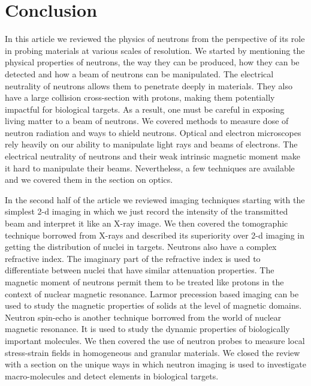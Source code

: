 \documentclass{article}
\numberwithin{equation}{section}
\begin{document}
\section{Conclusion}\label{s15}
In this article we reviewed the physics of neutrons from the perspective of its
role in probing materials at various scales of resolution. We started by 
mentioning the physical properties of neutrons, the way they can be produced,
how they can be detected and how a beam of neutrons can be manipulated. The
electrical neutrality of neutrons allows them to penetrate deeply in materials.
They also have a large collision cross-section with protons, making them
potentially impactful for biological targets. As a result, one must be careful
in exposing living matter to a beam of neutrons. We covered methods to measure
dose of neutron radiation and ways to shield neutrons. Optical and electron
microscopes rely heavily on our ability to manipulate light rays and beams of
electrons. The electrical neutrality of neutrons and their weak intrinsic
magnetic moment make it hard to manipulate their beams. Nevertheless, a few
techniques are available and we covered them in the section on optics.

In the second half of the article we reviewed imaging techniques starting with
the simplest 2-d imaging in which we just record the intensity of the 
transmitted beam and interpret it like an X-ray image. We then covered the
tomographic technique borrowed from X-rays and described its superiority over
2-d imaging in getting the distribution of nuclei in targets. Neutrons also 
have a complex refractive index. The imaginary part of the refractive index is
used to differentiate between nuclei that have similar attenuation properties.
The magnetic moment of neutrons permit them to be treated like protons in the
context of nuclear magnetic resonance. Larmor precession based imaging can be 
used to study the magnetic properties of solids at the level of magnetic 
domains. Neutron spin-echo is another technique borrowed from the world of 
nuclear magnetic resonance. It is used to study the dynamic properties of 
biologically important molecules. We then covered the use of neutron probes to 
measure local stress-strain fields in homogeneous and granular materials. 
We closed the review with a section on the
unique ways in which neutron imaging is used to investigate macro-molecules
and detect elements in biological targets.



\end{document}
